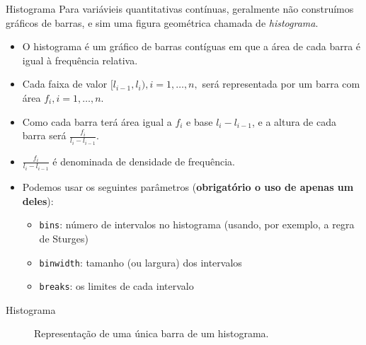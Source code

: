 \documentclass[
  10pt,
  ignorenonframetext,
]{beamer}
\providecommand{\tightlist}{%
  \setlength{\itemsep}{0pt}\setlength{\parskip}{0pt}}\usepackage{longtable,booktabs,array}
\begin{document}
\begin{frame}[fragile]{Histograma}
\protect\hypertarget{histograma}{}
Para variávieis quantitativas contínuas, geralmente não construímos
gráficos de barras, e sim uma figura geométrica chamada de
\emph{histograma}.

\begin{itemize}
\tightlist
\item
  O histograma é um gráfico de barras contíguas em que a área de cada
  barra é igual à frequência relativa.
\item
  Cada faixa de valor \([l_{i-1}, l_{i}), i=1, \dots, n,\) será
  representada por um barra com área \(f_i, i=1, \dots, n\).
\item
  Como cada barra terá área igual a \(f_i\) e base \(l_i - l_{i-1}\), e
  a altura de cada barra será \(\frac{f_i}{l_i - l_{i-1}}\).
\item
  \(\frac{f_i}{l_i - l_{i-1}}\) é denominada de densidade de frequência.
\item
  Podemos usar os seguintes parâmetros (\textbf{obrigatório o uso de
  apenas um deles}):

  \begin{itemize}
  \tightlist
  \item
    \texttt{bins}: número de intervalos no histograma (usando, por
    exemplo, a regra de Sturges)
  \item
    \texttt{binwidth}: tamanho (ou largura) dos intervalos
  \item
    \texttt{breaks}: os limites de cada intervalo
  \end{itemize}
\end{itemize}
\end{frame}

\begin{frame}{Histograma}
\protect\hypertarget{histograma-1}{}
\begin{figure}
\centering
\caption{Representação de uma única barra de um histograma.}
\end{figure}
\end{frame}
\end{document}

